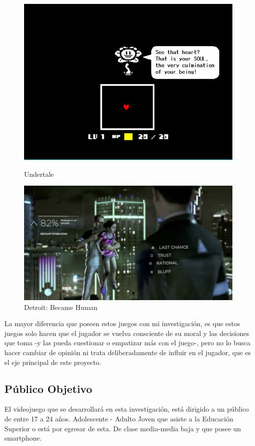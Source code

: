 \begin{figure}
    \centering
    \begin{minipage}{.49\textwidth}
        \includegraphics[width=\textwidth]{imgs/undertale.png}
        \caption{Undertale}
        \label{fig:undertale}
    \end{minipage}
    \begin{minipage}{.49\textwidth}
        \includegraphics[width=\textwidth]{imgs/detroit-choices.jpg}
        \caption{Detroit: Became Human}
        \label{fig:detroit}
    \end{minipage}
\end{figure}

La mayor diferencia que poseen estos juegos con mi investigación, es que estos juegos solo hacen que el jugador se vuelva consciente de su moral y las decisiones que toma -y las pueda cuestionar o empatizar más con el juego-, pero no lo busca hacer cambiar de opinión ni trata deliberadamente de influir en el jugador, que es el eje principal de este proyecto.

\subsection{Público Objetivo}

El videojuego que se desarrollará en esta investigación, está dirigido a un público de entre 17 a 24 años. Adolescente - Adulto Joven que asiste a la Educación Superior o está por egresar de esta. De clase media-media baja y que posee un \gls{smartphone}.